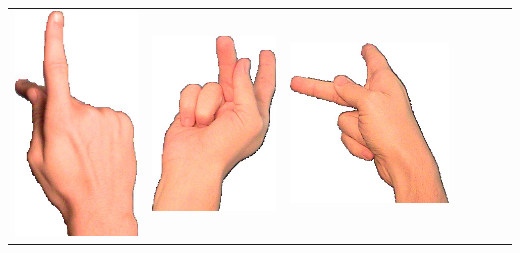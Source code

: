\documentclass{article}
\begin{document}
\begin{center}
\begin{tabular}{r*{6}{c}}
\includegraphics[scale=0.1]{images/03-12-3.jpg}&
\includegraphics[scale=0.1]{images/03-12-4.jpg}&
\includegraphics[scale=0.1]{images/03-12-5.jpg}&

\end{tabular}
\end{center}
\end{document}
